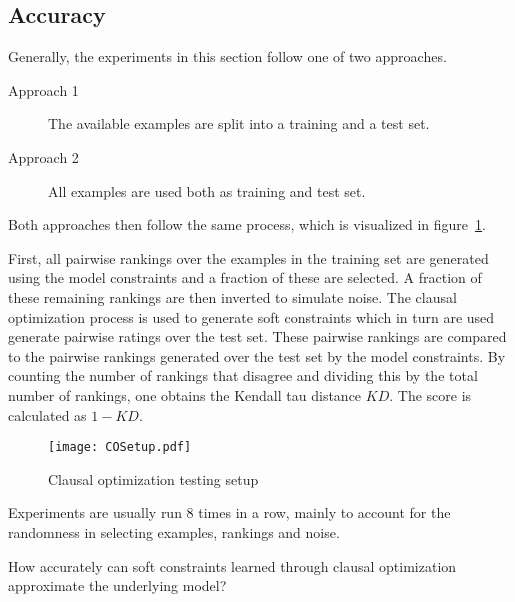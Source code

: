 \subsection{Accuracy}

Generally, the experiments in this section follow one of two approaches.
\begin{description}
	\item[Approach 1] The available examples are split into a training and a test set.
	\item[Approach 2] All examples are used both as training and test set.
\end{description}
Both approaches then follow the same process, which is visualized in figure~\ref{fig:co_test_setup}.

First, all pairwise rankings over the examples in the training set are generated using the model constraints and a fraction of these are selected.
A fraction of these remaining rankings are then inverted to simulate noise.
The clausal optimization process is used to generate soft constraints which in turn are used generate pairwise ratings over the test set.
These pairwise rankings are compared to the pairwise rankings generated over the test set by the model constraints.
By counting the number of rankings that disagree and dividing this by the total number of rankings, one obtains the Kendall tau distance $\mathit{KD}$.
The score is calculated as $1 - \mathit{KD}$.

\begin{figure}

	\caption{Clausal optimization testing setup}
	\centering
		\texttt{[image: COSetup.pdf]}
	\label{fig:co_test_setup}

\end{figure}

Experiments are usually run $8$ times in a row, mainly to account for the randomness in selecting examples, rankings and noise.

\begin{question}
	How accurately can soft constraints learned through clausal optimization approximate the underlying model?
\end{question}

